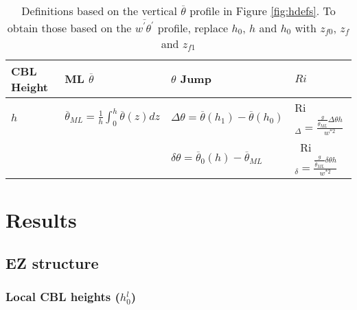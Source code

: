 \begin{table}[htbp]
\caption[Height definitions]{Definitions based on the vertical $\overline{\theta}$ profile in Figure \ref{fig:hdefs}. To obtain those based on the $\overline{w^{'}\theta^{'}}$ profile, replace $h_{0}$, $h$ and $h_{0}$ with $z_{f0}$, $z_{f}$ and $z_{f1}$}
    \begin{tabular}{p{} p{} p{3cm} p{2.5cm}}
      CBL Height & ML $\overline{\theta}$ & $\theta$ Jump &$     Ri $\\ \hline 
       $h$ & $\overline{\theta}_{ML} = \frac{1}{h}\int^{h}_{0}\overline{\theta}(z)dz$ & $\Delta \theta=\overline{\theta}(h_{1})-\overline{\theta}(h_{0})$ &      Ri $_{\Delta}=\frac{\frac{g}{\overline{\theta}_{ML}}\Delta \theta h}{w^{*2}}$  \\ [.3cm] %
        
       & &$\delta \theta = \overline{\theta}_{0}(h)- \overline{\theta}_{ML}$ & \    Ri $_{\delta}=\frac{\frac{g}{\overline{\theta}_{ML}} \delta \theta h}{w^{*2}}$ \\ \hline
      \end{tabular}
\label{tab:reldefs}   
\end{table}

\section{Results}
\subsection{EZ structure}
\subsubsection{Local CBL heights ($h_{0}^{l}$)}
\label{subsubsec:loccblh}

